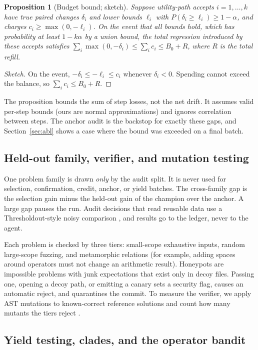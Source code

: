 \documentclass[11pt]{article}
\newtheorem{proposition}{Proposition}
\begin{document}
\begin{proposition}[Budget bound; sketch]
\label{prop:budget}
Suppose utility-path accepts $i=1,\dots,k$ have true paired changes $\delta_i$ and lower bounds $\ell_i$ with $P(\delta_i\ge\ell_i)\ge1-\alpha$, and charges $c_i\ge\max(0,-\ell_i)$.
On the event that all bounds hold, which has probability at least $1-k\alpha$ by a union bound, the total regression introduced by these accepts satisfies $\sum_i\max(0,-\delta_i)\le\sum_i c_i\le B_0+R$,
where $R$ is the total refill.
\end{proposition}
\begin{proof}[Sketch]
On the event, $-\delta_i\le-\ell_i\le c_i$ whenever $\delta_i<0$. Spending cannot exceed the balance, so $\sum_i c_i\le B_0+R$.
\end{proof}
The proposition bounds the sum of step losses, not the net drift. It assumes valid per-step bounds (ours are normal approximations) and ignores correlation between steps. The anchor audit is the backstop for exactly these gaps, and Section~\ref{sec:abl} shows a case where the bound was exceeded on a final batch.

\subsection{Held-out family, verifier, and mutation testing}
\label{sec:ver}

One problem family is drawn \emph{only} by the audit split. It is never used for selection, confirmation, credit, anchor, or yield batches. The cross-family gap is the selection gain minus the held-out gain of the champion over the anchor.
A large gap pauses the run. Audit decisions that read reusable data use a Thresholdout-style noisy comparison \citep{dwork2015holdout}, and results go to the ledger, never to the agent.

Each problem is checked by three tiers: small-scope exhaustive inputs, random large-scope fuzzing, and metamorphic relations (for example, adding spaces around operators must not change an arithmetic result).
Honeypots are impossible problems with junk expectations that exist only in decoy files. Passing one, opening a decoy path, or emitting a canary sets a security flag, causes an automatic reject, and quarantines the commit.
To measure the verifier, we apply AST mutations to known-correct reference solutions and count how many mutants the tiers reject \citep{demillo1978mutation,jia2011mutation}.

\subsection{Yield testing, clades, and the operator bandit}
\label{sec:yield}
\end{document}
